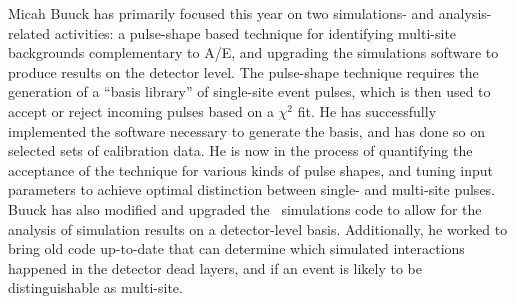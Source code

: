 Micah Buuck has primarily focused this year on two simulations- and analysis-related activities: a pulse-shape based technique for identifying multi-site backgrounds complementary to A/E, and upgrading the simulations software to produce results on the detector level.\newline
\indent The pulse-shape technique requires the generation of a ``basis library'' of single-site event pulses, which is then used to accept or reject incoming pulses based on a $\chi^2$ fit. He has successfully implemented the software necessary to generate the basis, and has done so on selected sets of calibration data. He is now in the process of quantifying the acceptance of the technique for various kinds of pulse shapes, and tuning input parameters to achieve optimal distinction between single- and multi-site pulses.\newline
\indent Buuck has also modified and upgraded the \MJ\ simulations code to allow for the analysis of simulation results on a detector-level basis. Additionally, he worked to bring old code up-to-date that can determine which simulated interactions happened in the detector dead layers, and if an event is likely to be distinguishable as multi-site.

